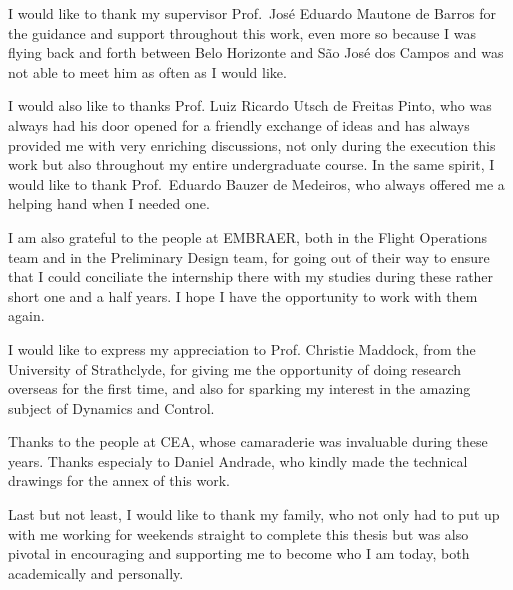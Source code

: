 \documentclass[tcc]{subfile}
\begin{document}
\begin{agradecimentos}

    I would like to thank my supervisor Prof.\ José Eduardo Mautone de Barros for
    the guidance and support throughout this work, even more so because I was
    flying back and forth between Belo Horizonte and  São José dos Campos 
    and was not able to meet him as often as I would like.

    I would also like to thanks Prof. Luiz Ricardo Utsch de Freitas Pinto, who was
    always had his door opened for a friendly exchange of ideas and has always provided
    me with very enriching discussions, not only during the execution this work
    but also throughout my entire undergraduate course.  In the same spirit, I
    would like to thank Prof.\ Eduardo Bauzer de Medeiros, who always offered
    me a helping hand when I needed one.

    I am also grateful to the people at EMBRAER, both in the Flight Operations
    team and in the Preliminary Design team, for going out of their
    way to ensure that I could conciliate the internship there with my studies
    during these rather short one and a half years. I
    hope I have the opportunity to work with them again.

    I would like to express my appreciation to Prof. Christie Maddock, from the
    University of Strathclyde, for giving me the opportunity of doing research overseas for the first time,
    and also for sparking my interest in the amazing subject of Dynamics and Control.

    Thanks to the people at CEA, whose camaraderie was invaluable during these years. 
    Thanks especialy to Daniel Andrade, who kindly made the technical drawings 
    for the annex of this work.

    Last but not least, I would like to thank my family, who not only had to put up
    with me working for weekends straight to complete this thesis but was also
    pivotal in encouraging and supporting me to become who I am today, both
    academically and personally. 

\end{agradecimentos}
\end{document}
